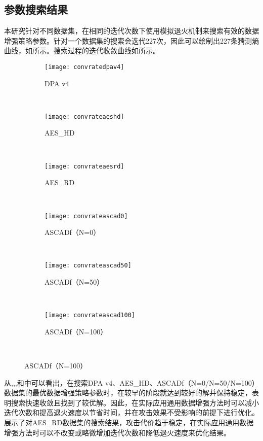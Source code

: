 {	\subsection{参数搜索结果}
	本研究针对不同数据集，在相同的迭代次数下使用模拟退火机制来搜索有效的数据增强策略参数。针对一个数据集的搜索会迭代227次，因此可以绘制出227条猜测熵曲线，如所示。搜索过程的迭代收敛曲线如所示。
	\begin{figure}[!htbp]
		\centering
		\begin{subfigure}[b]{\trif\textwidth}
			\texttt{[image: convratedpav4]}
			\caption{DPA v4}
			\label{fig:convratedpav4}
		\end{subfigure}%
		~%
		\begin{subfigure}[b]{\trif\textwidth}
			\texttt{[image: convrateaeshd]}
			\caption{AES\_HD}
			\label{fig:convrateaeshd}
		\end{subfigure}
		~%
		\begin{subfigure}[b]{\trif\textwidth}
			\texttt{[image: convrateaesrd]}
			\caption{AES\_RD}
			\label{fig:convrateaesrd}
		\end{subfigure}
		\\%
		\begin{subfigure}[b]{\trif\textwidth}
			\texttt{[image: convrateascad0]}
			\caption{ASCADf（N=0）}
			\label{fig:convrateascad0}
		\end{subfigure}%
		~%
		\begin{subfigure}[b]{\trif\textwidth}
			\texttt{[image: convrateascad50]}
			\caption{ASCADf（N=50）}
			\label{fig:convrateascad50}
		\end{subfigure}
		~%
		\begin{subfigure}[b]{\trif\textwidth}
			\texttt{[image: convrateascad100]}
			\caption{ASCADf（N=100）}
			\label{fig:convrateascad100}
		\end{subfigure}
		\\%
		\label{fig:convrateit}
	\end{figure}
	
	从,,,和中可以看出，在搜索DPA v4、AES\_HD、ASCADf（N=0/N=50/N=100）数据集的最优数据增强策略参数时，在较早的阶段就达到较好的解并保持稳定，表明搜索快速收敛且找到了较优解。因此，在实际应用通用数据增强方法时可以减小迭代次数和提高退火速度以节省时间，并在攻击效果不受影响的前提下进行优化。展示了对AES\_RD数据集的搜索结果，攻击代价趋于稳定，在实际应用通用数据增强方法时可以不改变或略微增加迭代次数和降低退火速度来优化结果。
	
}
